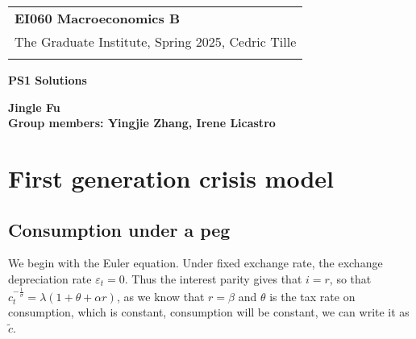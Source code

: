 \documentclass[a4paper,12pt]{article} %
\theoremstyle{nonitalic}
\begin{document}
\thispagestyle{empty} %

\begin{tabular}{p{15.5cm}} %
{\large \bf EI060 Macroeconomics B} \\
The Graduate Institute, Spring 2025, Cedric Tille\\
\hline %
\\
\end{tabular} %

\vspace*{0.3cm} %

\begin{center} %
	{\Large \bf PS1 Solutions} %
	\vspace{2mm}
	
	{\bf Jingle Fu \\ Group members: Yingjie Zhang, Irene Licastro} %
		
\end{center}  

\vspace{0.4cm}

\section{First generation crisis model}

\subsection{Consumption under a peg}\label{sec:1.1}

We begin with the Euler equation. Under fixed exchange rate, the exchange depreciation rate $\varepsilon_t = 0$.
Thus the interest parity gives that $i = r$, so that $c_t^{-\frac{1}{\sigma}} = \lambda (1 + \theta + \alpha r)$,
as we know that $r=\beta$ and $\theta$ is the tax rate on consumption, which is constant,
consumption will be constant, we can write it as $\tilde{c}$.
\end{document}
